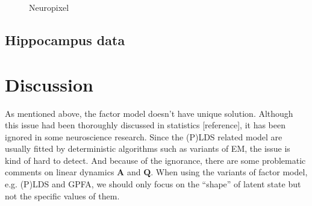 \documentclass{article}
\begin{document}
\begin{figure}[h!]
		\caption{Neuropixel}
	\end{figure}
	
	\subsection{Hippocampus data}
	
	\answerTODO{}
	
	\section{Discussion}
	
	As mentioned above, the factor model doesn’t have unique solution. Although this issue had been thoroughly discussed in statistics [reference], it has been ignored in some neuroscience research. Since the (P)LDS related model are usually fitted by deterministic algorithms such as variants of EM, the issue is kind of hard to detect. And because of the ignorance, there are some problematic comments on linear dynamics $\bm{A}$ and $\bm{Q}$. When using the variants of factor model, e.g. (P)LDS and GPFA, we should only focus on the “shape” of latent state but not the specific values of them.
	
\end{document}
